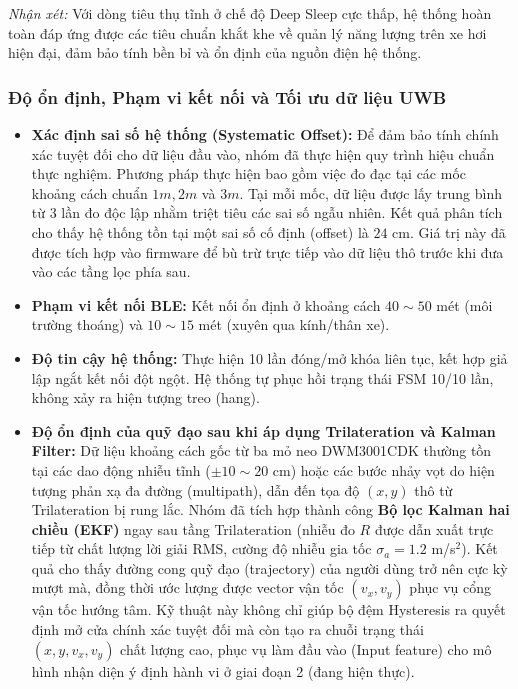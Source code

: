 \textit{Nhận xét:} Với dòng tiêu thụ tĩnh ở chế độ Deep Sleep cực thấp, hệ thống hoàn toàn đáp ứng được các tiêu chuẩn khắt khe về quản lý năng lượng trên xe hơi hiện đại, đảm bảo tính bền bỉ và ổn định của nguồn điện hệ thống.


\subsubsection{Độ ổn định, Phạm vi kết nối và Tối ưu dữ liệu UWB}
\begin{itemize}
    \item \textbf{Xác định sai số hệ thống (Systematic Offset):} Để đảm bảo tính chính xác tuyệt đối cho dữ liệu đầu vào, nhóm đã thực hiện quy trình hiệu chuẩn thực nghiệm. Phương pháp thực hiện bao gồm việc đo đạc tại các mốc khoảng cách chuẩn $1m, 2m$ và $3m$. Tại mỗi mốc, dữ liệu được lấy trung bình từ 3 lần đo độc lập nhằm triệt tiêu các sai số ngẫu nhiên. Kết quả phân tích cho thấy hệ thống tồn tại một sai số cố định (offset) là $24$ cm. Giá trị này đã được tích hợp vào firmware để bù trừ trực tiếp vào dữ liệu thô trước khi đưa vào các tầng lọc phía sau.
    
    \item \textbf{Phạm vi kết nối BLE:} Kết nối ổn định ở khoảng cách $40 \sim 50$ mét (môi trường thoáng) và $10 \sim 15$ mét (xuyên qua kính/thân xe).
    
    \item \textbf{Độ tin cậy hệ thống:} Thực hiện 10 lần đóng/mở khóa liên tục, kết hợp giả lập ngắt kết nối đột ngột. Hệ thống tự phục hồi trạng thái FSM 10/10 lần, không xảy ra hiện tượng treo (hang).
    
    \item \textbf{Độ ổn định của quỹ đạo sau khi áp dụng Trilateration và Kalman Filter:} Dữ liệu khoảng cách gốc từ ba mỏ neo DWM3001CDK thường tồn tại các dao động nhiễu tĩnh ($\pm 10\sim20$ cm) hoặc các bước nhảy vọt do hiện tượng phản xạ đa đường (multipath), dẫn đến tọa độ $(x, y)$ thô từ Trilateration bị rung lắc. Nhóm đã tích hợp thành công \textbf{Bộ lọc Kalman hai chiều (EKF)} ngay sau tầng Trilateration (nhiễu đo $R$ được dẫn xuất trực tiếp từ chất lượng lời giải RMS, cường độ nhiễu gia tốc $\sigma_a = 1.2$ m/s$^2$). Kết quả cho thấy đường cong quỹ đạo (trajectory) của người dùng trở nên cực kỳ mượt mà, đồng thời ước lượng được vector vận tốc $(v_x, v_y)$ phục vụ cổng vận tốc hướng tâm. Kỹ thuật này không chỉ giúp bộ đệm Hysteresis ra quyết định mở cửa chính xác tuyệt đối mà còn tạo ra chuỗi trạng thái $(x, y, v_x, v_y)$ chất lượng cao, phục vụ làm đầu vào (Input feature) cho mô hình nhận diện ý định hành vi ở giai đoạn 2 (đang hiện thực).
\end{itemize}


